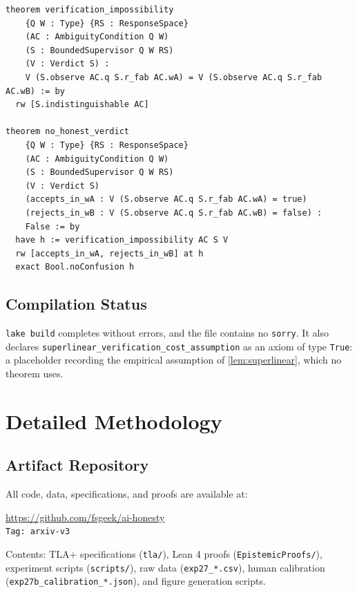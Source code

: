 \documentclass[11pt]{article}
\begin{document}
\begin{lstlisting}[caption=Verification Impossibility (Lean), label=lst:lean-verif]
theorem verification_impossibility
    {Q W : Type} {RS : ResponseSpace}
    (AC : AmbiguityCondition Q W)
    (S : BoundedSupervisor Q W RS)
    (V : Verdict S) :
    V (S.observe AC.q S.r_fab AC.wA) = V (S.observe AC.q S.r_fab AC.wB) := by
  rw [S.indistinguishable AC]

theorem no_honest_verdict
    {Q W : Type} {RS : ResponseSpace}
    (AC : AmbiguityCondition Q W)
    (S : BoundedSupervisor Q W RS)
    (V : Verdict S)
    (accepts_in_wA : V (S.observe AC.q S.r_fab AC.wA) = true)
    (rejects_in_wB : V (S.observe AC.q S.r_fab AC.wB) = false) :
    False := by
  have h := verification_impossibility AC S V
  rw [accepts_in_wA, rejects_in_wB] at h
  exact Bool.noConfusion h
\end{lstlisting}

\subsection{Compilation Status}

\texttt{lake build} completes without errors, and the file contains no \texttt{sorry}. It also declares \texttt{superlinear\_\allowbreak verification\_\allowbreak cost\_\allowbreak assumption} as an axiom of type \texttt{True}: a placeholder recording the empirical assumption of \autoref{lem:superlinear}, which no theorem uses.

\section{Detailed Methodology}\label{app:methodology}

\subsection{Artifact Repository}

All code, data, specifications, and proofs are available at:

\begin{center}
\url{https://github.com/fsgeek/ai-honesty}\\
\texttt{Tag: arxiv-v3}
\end{center}

\noindent Contents: TLA+ specifications (\texttt{tla/}), Lean 4 proofs (\texttt{EpistemicProofs/}), experiment scripts (\texttt{scripts/}), raw data (\texttt{exp27\_*.csv}), human calibration (\texttt{exp27b\_calibration\_*.json}), and figure generation scripts.
\end{document}
